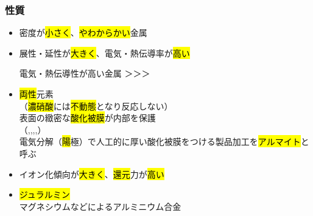\subsubsection{性質}
\begin{itemize}
  \item 密度が\hl{小さく}、\hl{やわからかい}金属
  \item 展性・延性が\hl{大きく}、電気・熱伝導率が\hl{高い}
        \begin{itembox}[l]{電気・熱伝導性が高い金属}
          \hl{}＞\hl{}＞\hl{}＞\hl{}
        \end{itembox}
  \item \hl{両性}元素\\
        （\hl{濃硝酸}には\hl{不動態}となり反応しない）\\
        表面の緻密な\hl{酸化被膜}が内部を保護\\
        （\R \hl{},\hl{},\hl{},\hl{},\hl{}）\\
        電気分解（\hl{陽}極）で人工的に厚い酸化被膜をつける製品加工を\hl{アルマイト}と呼ぶ
  \item イオン化傾向が\hl{大きく}、\hl{還元}力が\hl{高い}
  \item \hl{ジュラルミン}\\
      マグネシウムなどによるアルミニウム合金
\end{itemize}

